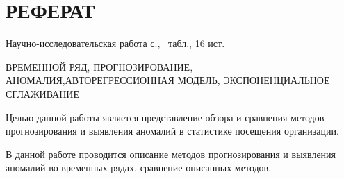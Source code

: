 
\chapter*{РЕФЕРАТ}

Научно-исследовательская работа \pageref{LastPage} с., \totaltables\ табл., 16  ист.

ВРЕМЕННОЙ РЯД, ПРОГНОЗИРОВАНИЕ, АНОМАЛИЯ,\linebreak  АВТОРЕГРЕССИОННАЯ МОДЕЛЬ, ЭКСПОНЕНЦИАЛЬНОЕ \linebreak\mbox{СГЛАЖИВАНИЕ}

Целью данной работы является представление обзора и сравнения методов прогнозирования и выявления аномалий в статистике посещения организации.

В данной работе проводится описание методов прогнозирования и выявления аномалий во временных рядах, сравнение описанных методов.



\pagebreak